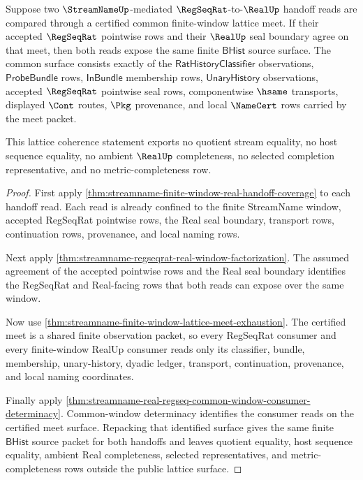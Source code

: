 \begin{theorem}
\label{thm:streamname-real-regseq-window-lattice-coherence}
Suppose two $\StreamNameUp$-mediated $\RegSeqRat$-to-$\RealUp$ handoff reads are compared through a certified common finite-window lattice meet. If their accepted $\RegSeqRat$ pointwise rows and their $\RealUp$ seal boundary agree on that meet, then both reads expose the same finite $\mathsf{BHist}$ source surface. The common surface consists exactly of the $\mathsf{RatHistoryClassifier}$ observations, $\mathsf{ProbeBundle}$ rows, $\mathsf{InBundle}$ membership rows, $\mathsf{UnaryHistory}$ observations, accepted $\RegSeqRat$ pointwise seal rows, componentwise $\hsame$ transports, displayed $\Cont$ routes, $\Pkg$ provenance, and local $\NameCert$ rows carried by the meet packet.

This lattice coherence statement exports no quotient stream equality, no host sequence equality, no ambient $\RealUp$ completeness, no selected completion representative, and no metric-completeness row.
\end{theorem}
\begin{proof}
First apply \autoref{thm:streamname-finite-window-real-handoff-coverage} to each handoff read. Each read is already confined to the finite StreamName window, accepted RegSeqRat pointwise rows, the Real seal boundary, transport rows, continuation rows, provenance, and local naming rows.

Next apply \autoref{thm:streamname-regseqrat-real-window-factorization}. The assumed agreement of the accepted pointwise rows and the Real seal boundary identifies the RegSeqRat and Real-facing rows that both reads can expose over the same window.

Now use \autoref{thm:streamname-finite-window-lattice-meet-exhaustion}. The certified meet is a shared finite observation packet, so every RegSeqRat consumer and every finite-window RealUp consumer reads only its classifier, bundle, membership, unary-history, dyadic ledger, transport, continuation, provenance, and local naming coordinates.

Finally apply \autoref{thm:streamname-real-regseq-common-window-consumer-determinacy}. Common-window determinacy identifies the consumer reads on the certified meet surface. Repacking that identified surface gives the same finite $\mathsf{BHist}$ source packet for both handoffs and leaves quotient equality, host sequence equality, ambient Real completeness, selected representatives, and metric-completeness rows outside the public lattice surface.
\end{proof}


